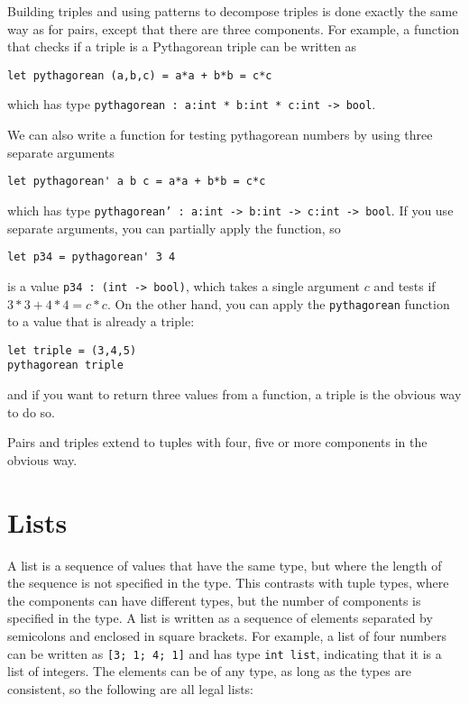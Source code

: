 \documentclass[a4paper]{article}
\begin{document}
\noindent
Building triples and using patterns to decompose triples is done
exactly the same way as for pairs, except that there are three
components.  For example, a function that checks if a triple is a
Pythagorean triple can be written as

\begin{verbatim}
let pythagorean (a,b,c) = a*a + b*b = c*c
\end{verbatim}

\noindent
which has type \texttt{pythagorean : a:int * b:int * c:int -> bool}.

We can also write a function for testing pythagorean numbers by using
three separate arguments

\begin{verbatim}
let pythagorean' a b c = a*a + b*b = c*c
\end{verbatim}

\noindent
which has type \texttt{pythagorean' : a:int -> b:int -> c:int ->
  bool}.  If you use separate arguments, you can partially apply the
function, so

\begin{verbatim}
let p34 = pythagorean' 3 4
\end{verbatim}

\noindent
is a value \texttt{p34 : (int -> bool)}, which takes a single argument
$c$ and tests if $3*3+4*4 = c*c$.  On the other hand, you can apply
the \texttt{pythagorean} function to a value that is already a triple:


\begin{verbatim}
let triple = (3,4,5)
pythagorean triple
\end{verbatim}

\noindent
and if you want to return three values from a function, a triple is
the obvious way to do so.

Pairs and triples extend to tuples with four, five or more components
in the obvious way.

\section{Lists}

A list is a sequence of values that have the same type, but where the
length of the sequence is not specified in the type.  This contrasts
with tuple types, where the components can have different types, but
the number of components is specified in the type.  A list is written
as a sequence of elements separated by semicolons and enclosed in
square brackets.  For example, a list of four numbers can be written
as \texttt{[3;~1;~4;~1]} and has type \texttt{int~list}, indicating
that it is a list of integers.  The elements can be of any type, as
long as the types are consistent, so the following are all legal
lists:
\end{document}
